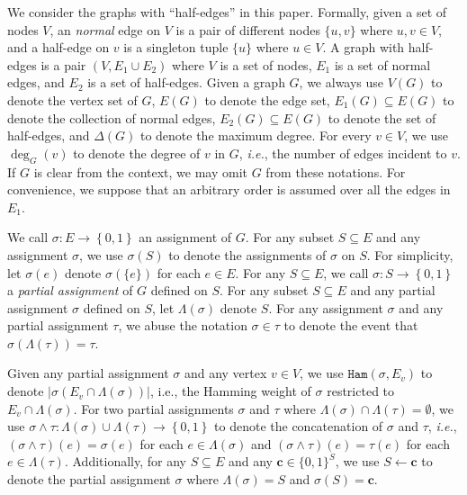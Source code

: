 \documentclass[11pt]{article}
\newcommand{\abs}[1]{\left\vert#1\right\vert}
\newcommand{\set}[1]{\left\{#1\right\}}
\def\!#1{\mathtt{#1}}
\def\IE{\emph{i.e.}}
\newcommand{\Ham}{\!{Ham}}
\newcommand{\Par}{\!{Par}}
\newcommand{\qtodo}[1]{\todo[color = purple!40, size = \tiny]{\textbf{guoliang:} #1}}
\newcommand{\hktodo}[1]{{\color{blue}{#1}}}
\begin{document}
We consider the graphs with ``half-edges'' in this paper.
Formally, given a set of nodes $V$, an \emph{normal} edge on $V$ is a pair of different nodes $\{u,v\}$ where $u,v\in V$,
and a half-edge on $v$ is a singleton tuple $\{u\}$ where $u \in V$.
A graph with half-edges is a pair $(V,E_1\cup E_2)$ where $V$ is a set of nodes, $E_1$ is a set of normal edges,
and $E_2$ is a set of half-edges. 
Given a graph $G$, we always use $V(G)$ to denote the vertex set of $G$, $E(G)$ to denote the edge set, $E_1(G) \subseteq E(G)$ to denote the collection of normal edges, $E_2(G)\subseteq E(G)$ to denote the set of half-edges, and $\Delta(G)$ to denote the maximum degree. 
For every $v \in V$, we use $\deg_G(v)$ to denote the degree of $v$ in $G$, \IE, the number of edges incident to $v$.
If $G$ is clear from the context, we may omit $G$ from these notations.
For convenience, we suppose that an arbitrary order is assumed over all the edges in $E_1$.


We call $\sigma: E\rightarrow \set{0,1}$ an assignment of $G$.
For any subset $S\subseteq E$ and any assignment $\sigma$, we use $\sigma(S)$ to denote the assignments of $\sigma$ on $S$.
For simplicity, let $\sigma(e)$ denote $\sigma(\{e\})$ for each $e\in E$. For any $S\subseteq E$, we call $\sigma: S\rightarrow \set{0,1}$ a \emph{partial assignment} of $G$ defined on $S$.
For any subset $S \subseteq E$ and any partial assignment $\sigma$ defined on $S$, 
let $\Lambda(\sigma)$ denote $S$.
For any assignment $\sigma$ and any partial assignment $\tau$,
we abuse the notation $\sigma\in \tau$ to denote the event that $\sigma(\Lambda(\tau)) =\tau$.

Given any partial assignment $\sigma$ and any vertex $v \in V$, we use $\Ham(\sigma, E_v)$ to denote $\abs{\sigma(E_v \cap \Lambda(\sigma))}$, i.e., the Hamming weight of $\sigma$ restricted to $E_v \cap \Lambda(\sigma)$.
For two partial assignments $\sigma$ and $\tau$ where $\Lambda(\sigma)\cap \Lambda(\tau) = \emptyset$, we use $\sigma \land \tau : \Lambda(\sigma) \cup \Lambda(\tau) \to \set{0, 1}$ to denote the concatenation of $\sigma$ and $\tau$, \IE, $(\sigma \land \tau)(e)=\sigma(e)$ for each $e\in \Lambda(\sigma)$ and $(\sigma \land \tau)(e)=\tau(e)$ for each $e\in \Lambda(\tau)$. 
{Additionally, for any $S\subseteq E$ and any $\boldsymbol{c} \in \{0,1\}^S$, we use $S \gets \boldsymbol{c}$ to denote the partial assignment $\sigma$ where $\Lambda(\sigma) = S$ and $\sigma(S) = \boldsymbol{c}$.}
\end{document}
